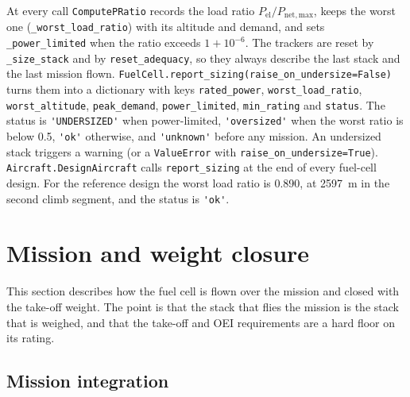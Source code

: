 \documentclass[a4paper,11pt]{article}
\newcommand{\code}[1]{\nolinkurl{#1}}
\newcommand{\fn}[1]{\nolinkurl{#1}}
\newcommand{\Pel}{P_\mathrm{el}}
\begin{document}
At every call \fn{ComputePRatio} records the load ratio $\Pel/P_\mathrm{net,max}$, keeps the
worst one (\code{_worst_load_ratio}) with its altitude and demand, and sets
\code{_power_limited} when the ratio exceeds $1+10^{-6}$. The trackers are reset by
\fn{_size_stack} and by \fn{reset_adequacy}, so they always describe the last stack and the
last mission flown. \fn{FuelCell.report_sizing(raise_on_undersize=False)} turns them into a
dictionary with keys \code{rated_power}, \code{worst_load_ratio}, \code{worst_altitude},
\code{peak_demand}, \code{power_limited}, \code{min_rating} and \code{status}. The status is
\code{'UNDERSIZED'} when power-limited, \code{'oversized'} when the worst ratio is below 0.5,
\code{'ok'} otherwise, and \code{'unknown'} before any mission. An undersized stack triggers a
warning (or a \code{ValueError} with \code{raise_on_undersize=True}).
\fn{Aircraft.DesignAircraft} calls \fn{report_sizing} at the end of every fuel-cell design.
For the reference design the worst load ratio is 0.890, at \SI{2597}{m} in the second climb
segment, and the status is \code{'ok'}.

\section{Mission and weight closure}
\label{sec:closure}

This section describes how the fuel cell is flown over the mission and closed with the
take-off weight. The point is that the stack that flies the mission is the stack that is
weighed, and that the take-off and OEI requirements are a hard floor on its rating.

\subsection{Mission integration}
\label{sec:mission}
\end{document}
